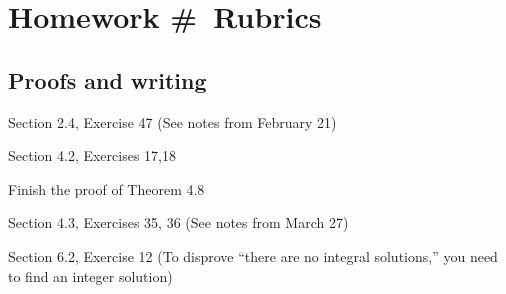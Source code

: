 \documentclass[letterpaper, 11pt]{ximera}
\begin{document}
\chapter{Homework \#\homework\ Rubrics}

\section*{Proofs and writing}  %
Section 2.4, Exercise 47 (See notes from February 21)

\noindent Section 4.2, Exercises 17,18

\noindent Finish the proof of Theorem 4.8

\noindent Section 4.3, Exercises 35, 36 (See notes from March 27)

\noindent Section 6.2, Exercise 12 (To disprove “there are no integral solutions,” you need to find an integer solution)
\end{document}

